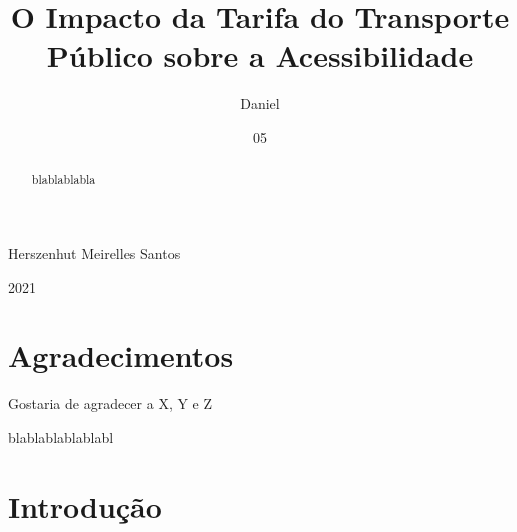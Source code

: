 \documentclass[msc,numbers]{coppe}
\begin{document}
  \title{O Impacto da Tarifa do Transporte Público sobre a Acessibilidade}
    \author{Daniel}{Herszenhut Meirelles Santos}
  

  

  \date{05}{2021}

  
  \maketitle

  \frontmatter
  \dedication{``O suburbano quando chega atrasado\\
O patrão mal-humorado\\
Diz que mora logo ali\\
Mas é porque não anda nesse trem lotado\\
Com o peito amargurado\\
Baldeando por aí\\
Imagine quem vem lá de Japeri\\
Imagine quem vem lá de Japeri''\\
(Guará e Jorginho das Rosas, 1984)}

    \chapter*{Agradecimentos}
  Gostaria de agradecer a X, Y e Z
 \begin{abstract}
blablablabla
 \end{abstract}
  \begin{foreignabstract}
blablablablablabl
  \end{foreignabstract}
  \tableofcontents

  \printlosymbols
  \printloabbreviations

  \mainmatter

  \hypertarget{intro}{%
  \chapter{Introdução}\label{intro}}
\end{document}
